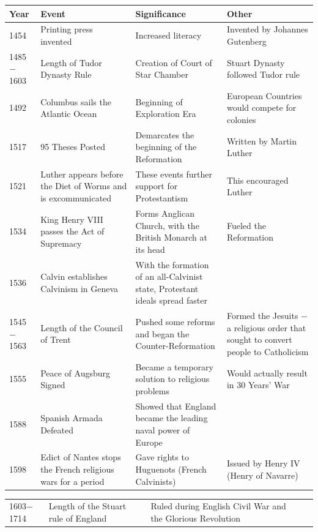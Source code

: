 \documentclass[12pt]{article}
\begin{document}
\begin{enumerate}
\hspace{-25pt}\begin{tabular}{|p{}|p{}|p{}|p{}|}
\hline
Year & Event & Significance & Other \\
\hline
1454 & Printing press invented & Increased literacy & Invented by Johannes Gutenberg \\
\hline
1485$-$1603 & Length of Tudor Dynasty Rule & Creation of Court of Star Chamber & Stuart Dynasty followed Tudor rule  \\
\hline
1492 & Columbus sails the Atlantic Ocean & Beginning of Exploration Era & European Countries would compete for colonies \\
\hline
1517 & 95 Theses Posted & Demarcates the beginning of the Reformation & Written by Martin Luther  \\
\hline
1521 & Luther appears before the Diet of Worms and is excommunicated  & These events further support for Protestantism  & This encouraged Luther  \\
\hline
1534 & King Henry VIII passes the Act of Supremacy & Forms Anglican Church, with the British Monarch at its head  & Fueled the Reformation  \\
\hline
1536 & Calvin establishes Calvinism in Geneva & With the formation of an all-Calvinist state, Protestant ideals spread faster  & \\
\hline
1545$-$1563 & Length of the Council of Trent & Pushed some reforms and began the Counter-Reformation & Formed the Jesuits $-$ a religious order that sought to convert people to Catholicism  \\
\hline
1555 & Peace of Augsburg Signed & Became a temporary solution to religious problems & Would actually result in 30 Years' War \\
\hline
1588 & Spanish Armada Defeated & Showed that England became the leading naval power of Europe & \\
\hline
1598 & Edict of Nantes stops the French religious wars for a period & Gave rights to Huguenots (French Calvinists)  & Issued by Henry IV (Henry of Navarre)  \\
\hline
\end{tabular}
\newpage
\hspace{-25pt}\begin{tabular}{|p{}|p{}|p{}|p{}|}
\hline
1603$-$1714 & Length of the Stuart rule of England  & Ruled during English Civil War and the Glorious Revolution  & \\

\end{tabular}
\end{enumerate}
\end{document}
